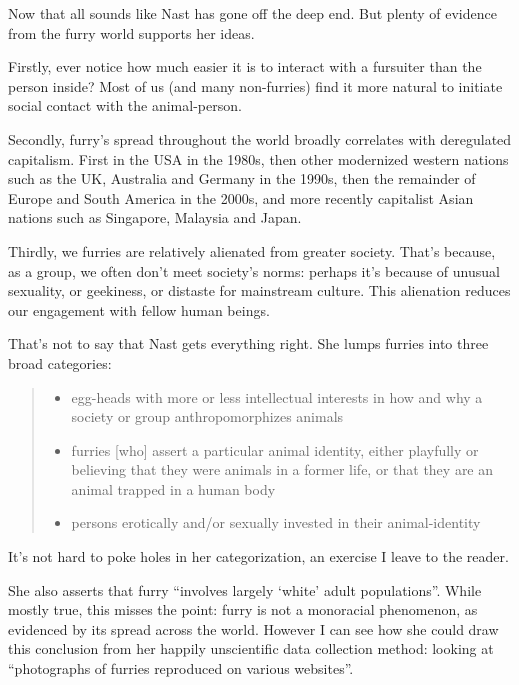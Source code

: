 \secdiv

Now that all sounds like Nast has gone off the deep end. But plenty of evidence from the furry world supports her ideas.

Firstly, ever notice how much easier it is to interact with a fursuiter than the person inside? Most of us (and many non-furries) find it more natural to initiate social contact with the animal-person.

Secondly, furry's spread throughout the world broadly correlates with deregulated capitalism. First in the USA in the 1980s, then other modernized western nations such as the UK, Australia and Germany in the 1990s, then the remainder of Europe and South America in the 2000s, and more recently capitalist Asian nations such as Singapore, Malaysia and Japan.

Thirdly, we furries are relatively alienated from greater society. That's because, as a group, we often don't meet society's norms: perhaps it's because of unusual sexuality, or geekiness, or distaste for mainstream culture. This alienation reduces our engagement with fellow human beings.

That's not to say that Nast gets everything right. She lumps furries into three broad categories:

\begin{quote}
  \begin{itemize}
    \item egg-heads with more or less intellectual interests in how and why a society or group anthropomorphizes animals
    \item furries [who] assert a particular animal identity, either playfully or believing that they were animals in a former life, or that they are an animal trapped in a human body
    \item persons erotically and/or sexually invested in their animal-identity
  \end{itemize}
\end{quote}

It's not hard to poke holes in her categorization, an exercise I leave to the reader.

She also asserts that furry ``involves largely `white' adult populations''. While mostly true, this misses the point: furry is not a monoracial phenomenon, as evidenced by its spread across the world. However I can see how she could draw this conclusion from her happily unscientific data collection method: looking at ``photographs of furries reproduced on various websites''.


